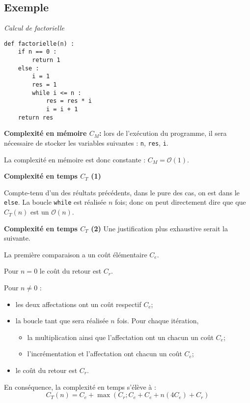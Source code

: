 \subsection{Exemple}

\begin{exemple}
\textit{Calcul de factorielle}
\begin{lstlisting}
def factorielle(n) :
    if n == 0 : 
        return 1
    else : 
        i = 1
        res = 1
        while i <= n :
            res = res * i
            i = i + 1
    return res
\end{lstlisting}


\textbf{Complexité en mémoire $C_M$:} lors de l'exécution du programme, il sera nécessaire de stocker les variables suivantes : 
\texttt{n}, \texttt{res}, \texttt{i}.

La complexité en mémoire est donc constante : $C_M = \mathcal{O}(1)$.

\textbf{Complexité en temps $C_T$ (1)}

Compte-tenu d'un des réultats précédents, dans le pure des cas, on est dans le \texttt{else}. La boucle \texttt{while} est réalisée $n$ fois; donc on peut directement dire que que $C_T(n)$ est un $\mathcal{O}(n)$.
 
\textbf{Complexité en temps $C_T$ (2)}
Une justification plus exhaustive serait la suivante.


La première comparaison a un coût élémentaire $C_e$.

Pour $n=0$  le coût du retour est $C_r$.

Pour $n \neq 0$ :
\begin{itemize}
\item les deux affectations ont un coût respectif $C_e$;
\item la boucle tant que sera réalisée $n$ fois. Pour chaque itération, 
\begin{itemize}
\item la multiplication ainsi que l'affectation ont un chacun un coût $C_e$;
\item l'incrémentation et l'affectation ont chacun un coût $C_e$;
\end{itemize}
\item le coût du retour est $C_r$.
\end{itemize}
En conséquence, la complexité en temps s'élève à :
$$C_T(n) = C_e + \max\left( C_r;  C_e + C_e + n\left( 4C_e\right) + C_r\right)$$


\end{exemple}
